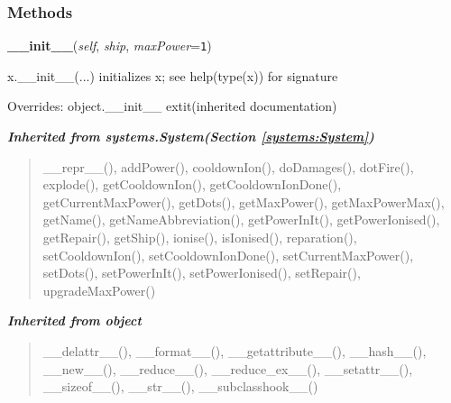 
  \subsubsection{Methods}

    \vspace{0.5ex}

\hspace{.8\funcindent}\begin{boxedminipage}{\funcwidth}

    \raggedright \textbf{\_\_init\_\_}(\textit{self}, \textit{ship}, \textit{maxPower}={\tt 1})

\setlength{\parskip}{2ex}
    x.\_\_init\_\_(...) initializes x; see help(type(x)) for signature

\setlength{\parskip}{1ex}
      Overrides: object.\_\_init\_\_ 	extit{(inherited documentation)}

    \end{boxedminipage}


\large{\textbf{\textit{Inherited from systems.System\textit{(Section \ref{systems:System})}}}}

\begin{quote}
\_\_repr\_\_(), addPower(), cooldownIon(), doDamages(), dotFire(), explode(), getCooldownIon(), getCooldownIonDone(), getCurrentMaxPower(), getDots(), getMaxPower(), getMaxPowerMax(), getName(), getNameAbbreviation(), getPowerInIt(), getPowerIonised(), getRepair(), getShip(), ionise(), isIonised(), reparation(), setCooldownIon(), setCooldownIonDone(), setCurrentMaxPower(), setDots(), setPowerInIt(), setPowerIonised(), setRepair(), upgradeMaxPower()
\end{quote}

\large{\textbf{\textit{Inherited from object}}}

\begin{quote}
\_\_delattr\_\_(), \_\_format\_\_(), \_\_getattribute\_\_(), \_\_hash\_\_(), \_\_new\_\_(), \_\_reduce\_\_(), \_\_reduce\_ex\_\_(), \_\_setattr\_\_(), \_\_sizeof\_\_(), \_\_str\_\_(), \_\_subclasshook\_\_()
\end{quote}


